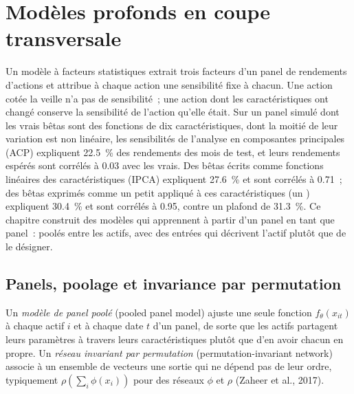 \chapter{Modèles profonds en coupe transversale}\label{ch:ml:cross-sectional-deep-models}

Un modèle à facteurs statistiques extrait trois facteurs d'un panel de rendements d'actions et attribue à chaque action une sensibilité fixe à
chacun. Une action cotée la veille n'a pas de sensibilité~; une action dont les caractéristiques ont changé conserve la sensibilité de l'action
qu'elle était. Sur un panel simulé dont les vrais bêtas sont des fonctions de dix caractéristiques, dont la moitié de leur variation est non linéaire,
les sensibilités de l'analyse en composantes principales (ACP) expliquent 22.5~\% des rendements des mois de test, et leurs rendements espérés
sont corrélés à 0.03 avec les vrais. Des bêtas écrits comme fonctions linéaires des caractéristiques (IPCA)
expliquent 27.6~\% et sont corrélés à 0.71~; des bêtas exprimés comme un petit  appliqué à ces caractéristiques (un )
expliquent 30.4~\% et sont corrélés à 0.95, contre un plafond de 31.3~\%. Ce chapitre construit des modèles qui apprennent à partir d'un panel
en tant que panel~: poolés entre les actifs, avec des entrées qui décrivent l'actif plutôt que de le désigner.

\section{Panels, poolage et invariance par permutation}

\begin{definition}\label{def:ml:cross-sectional-deep-models:pooled}
Un \emph{modèle de panel poolé} (pooled panel model) ajuste une seule fonction $f_\theta(x_{it})$ à chaque actif $i$ et à chaque date $t$
d'un panel, de sorte que les actifs partagent leurs paramètres à travers leurs caractéristiques plutôt que d'en avoir chacun en propre. Un
\emph{réseau invariant par permutation} (permutation-invariant network) associe à un ensemble de vecteurs une sortie
qui ne dépend pas de leur ordre, typiquement $\rho(\sum_i\phi(x_i))$ pour des réseaux $\phi$ et $\rho$ (Zaheer et al., 2017).
\end{definition}

